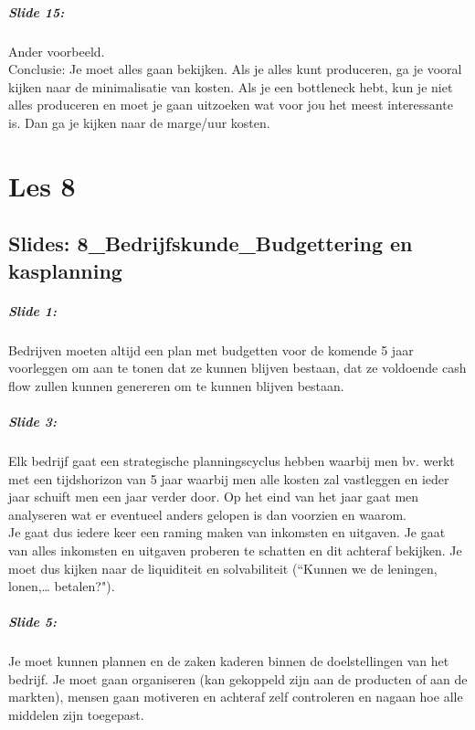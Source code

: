\documentclass[10pt,a4paper]{report}
\begin{document}
\paragraph{Slide 15:} Ander voorbeeld.\\
Conclusie: Je moet alles gaan bekijken. Als je alles kunt produceren, ga je vooral kijken naar de minimalisatie van kosten. Als je een bottleneck hebt, kun je niet alles produceren en moet je gaan uitzoeken wat voor jou het meest interessante is. Dan ga je kijken naar de marge/uur kosten. 

\chapter{Les 8}

\section{Slides: 8\_Bedrijfskunde\_Budgettering en kasplanning}

\paragraph{Slide 1:} Bedrijven moeten altijd een plan met budgetten voor de komende 5 jaar voorleggen om aan te tonen dat ze kunnen blijven bestaan, dat ze voldoende cash flow zullen kunnen genereren om te kunnen blijven bestaan.

\paragraph{Slide 3:} Elk bedrijf gaat een strategische planningscyclus hebben waarbij men bv. werkt met een tijdshorizon van 5 jaar waarbij men alle kosten zal vastleggen en ieder jaar schuift men een jaar verder door. Op het eind van het jaar gaat men analyseren wat er eventueel anders gelopen is dan voorzien en waarom.\\
Je gaat dus iedere keer een raming maken van inkomsten en uitgaven. 
Je gaat van alles inkomsten en uitgaven proberen te schatten en dit achteraf bekijken. Je moet dus kijken naar de liquiditeit en solvabiliteit (``Kunnen we de leningen, lonen,… betalen?").

\paragraph{Slide 5:} Je moet kunnen plannen en de zaken kaderen binnen de doelstellingen van het bedrijf. Je moet gaan organiseren (kan gekoppeld zijn aan de producten of aan de markten), mensen gaan motiveren en achteraf zelf controleren  en nagaan hoe alle middelen zijn toegepast.
\end{document}
